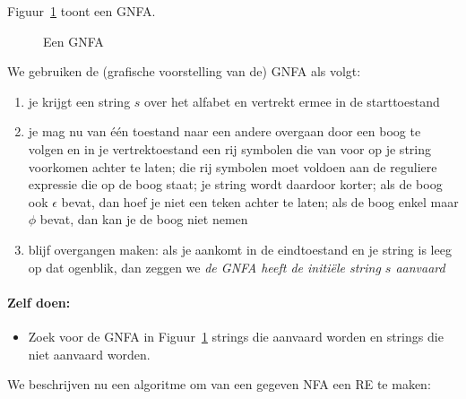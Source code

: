 Figuur~\ref{gfsa1} toont een GNFA.

\begin{figure}[h]
\caption{Een GNFA\label{gfsa1}}
\end{figure}

We gebruiken de (grafische voorstelling van de) GNFA als volgt:

\begin{enumerate}
\item je krijgt een string $s$ over het alfabet en vertrekt ermee in
de starttoestand
\item je mag nu van \'{e}\'{e}n toestand naar een andere overgaan door
een boog te volgen en in je vertrektoestand een rij symbolen die van
voor op je string voorkomen achter te laten; die rij symbolen moet
voldoen aan de reguliere expressie die op de boog staat; je string wordt
daardoor korter; als de boog ook $\epsilon$ bevat, dan hoef je niet
een teken achter te laten; als de boog enkel maar $\phi$ bevat, dan
kan je de boog niet nemen
\item blijf overgangen maken: als je aankomt in de eindtoestand en
je string is leeg op dat ogenblik, dan zeggen we {\em de GNFA heeft de
initi\"ele string $s$ aanvaard}
\end{enumerate}

\paragraph{Zelf doen:}
\begin{itemize}
\item[]
Zoek voor de GNFA in Figuur~\ref{gfsa1} strings
die aanvaard worden en strings die niet aanvaard worden.
\end{itemize}


We beschrijven nu een algoritme om van een gegeven NFA een RE te maken:

